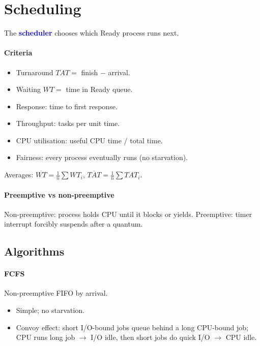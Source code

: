\section{Scheduling}
The \textcolor{Blue}{\textbf{scheduler}} chooses which Ready process runs next.

\paragraph{Criteria}
\begin{itemize}
  \item \textcolor{Bittersweet}{Turnaround} $TAT=$ finish $-$ arrival.
  \item \textcolor{Bittersweet}{Waiting} $WT=$ time in Ready queue.
  \item \textcolor{Bittersweet}{Response}: time to first response.
  \item \textcolor{Bittersweet}{Throughput}: tasks per unit time.
  \item \textcolor{Bittersweet}{CPU utilisation}: useful CPU time / total time.
  \item \textcolor{Bittersweet}{Fairness}: every process eventually runs (no starvation).
\end{itemize}
Averages: $\overline{WT}=\frac{1}{n}\sum WT_i$, $\overline{TAT}=\frac{1}{n}\sum TAT_i$.

\paragraph{Preemptive vs non-preemptive}
\textcolor{Bittersweet}{Non-preemptive}: process holds CPU until it blocks or yields.
\textcolor{Bittersweet}{Preemptive}: timer interrupt forcibly suspends after a quantum.

\subsection{Algorithms}

\paragraph{FCFS} Non-preemptive FIFO by arrival.
\begin{itemize}
  \item Simple; no starvation.
  \item \textcolor{Bittersweet}{Convoy effect}: short I/O-bound jobs queue behind a long CPU-bound job; CPU runs long job $\to$ I/O idle, then short jobs do quick I/O $\to$ CPU idle.
\end{itemize}

